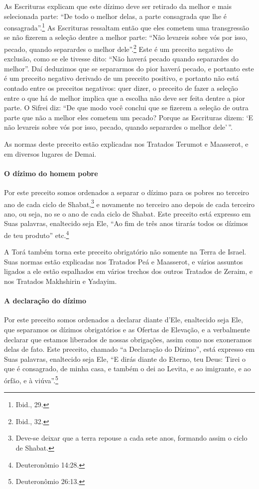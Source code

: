 As Escrituras explicam que este dízimo deve ser retirado da melhor e
mais selecionada parte: ``De todo o melhor delas, a parte consagrada que
lhe é consagrada''.\footnote{Ibid., 29.} As Escrituras ressaltam então que eles
cometem uma transgressão se não fizerem a seleção dentre a melhor parte:
``Não levareis sobre vós por isso, pecado, quando separardes o melhor
dele''.\footnote{Ibid., 32.} Este é um preceito negativo de exclusão, como se ele
tivesse dito: ``Não haverá pecado quando separardes do melhor''. Daí
deduzimos que se separarmos do pior haverá pecado, e portanto este é um
preceito negativo derivado de um preceito positivo, e portanto não está
contado entre os preceitos negativos: quer dizer, o preceito de fazer a
seleção entre o que há de melhor implica que a escolha não deve ser
feita dentre a pior parte. O Sifrei diz: ``De que modo você conclui que
se fizerem a seleção de outra parte que não a melhor eles cometem um
pecado? Porque as Escrituras dizem: `E não levareis sobre vós por isso,
pecado, quando separardes o melhor dele'\,''.

As normas deste preceito estão explicadas nos Tratados Terumot e
Maasserot, e em diversos lugares de Demai.

\paragraph{O dízimo do homem pobre}

Por este preceito somos ordenados a separar o dízimo para os pobres no
terceiro ano de cada ciclo de Shabat,\footnote{Deve-se deixar que a terra repouse a cada sete anos, formando assim o
  ciclo de Shabat.} e novamente
no terceiro ano depois de cada terceiro ano, ou seja, no se o ano de
cada ciclo de Shabat. Este preceito está expresso em Suas palavras,
enaltecido seja Ele, ``Ao fim de três anos tirarás todos os dízimos de
teu produto'' etc.\footnote{Deuteronômio 14:28.}

A Torá também torna este preceito obrigatório não somente na Terra de
Israel. Suas normas estão explicadas nos Tratados Peá e Maasserot, e
vários assuntos ligados a ele estão espalhados em vários trechos dos
outros Tratados de Zeraim, e nos Tratados Makhshirin e Yadayim.

\paragraph{A declaração do dízimo}

Por este preceito somos ordenados a declarar diante d'Ele, enaltecido
seja Ele, que separamos os dízimos obrigatórios e as Ofertas de
Elevação, e a verbalmente declarar que estamos liberados de nossas
obrigações, assim como nos exoneramos delas de fato. Este preceito,
chamado ``a Declaração do Dízimo'', está expresso em Suas palavras,
enaltecido seja Ele, ``E dirás diante do Eterno, teu Deus: Tirei o que é
consagrado, de minha casa, e também o dei ao Levita, e ao imigrante, e
ao órfão, e à viúva''.\footnote{Deuteronômio 26:13.}

